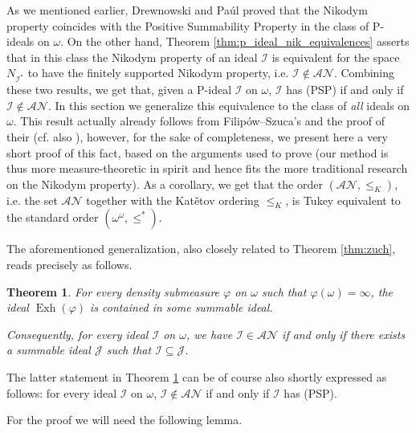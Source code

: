 \documentclass[a4paper,11pt,fleqn]{amsart}
\newtheorem{theorem}{Theorem}[section]
\theoremstyle{definition}
\theoremstyle{remark}
\numberwithin{equation}{section}
\newcommand{\aA}{\mathcal{A}}
\newcommand{\iI}{\mathcal{I}}
\newcommand{\jJ}{\mathcal{J}}
\newcommand{\nN}{\mathcal{N}}
\DeclareMathOperator{\exh}{Exh}
\newcommand{\sub}{\subseteq}
\begin{document}
As we mentioned earlier, Drewnowski and Pa\'ul \cite[Theorem 3.5]{DP00} proved that the Nikodym property coincides with the Positive Summability Property in the class of P-ideals on $\omega$. On the other hand, Theorem \ref{thm:p_ideal_nik_equivalences} asserts that in this class the Nikodym property of an ideal $\iI$ is equivalent for the space $N_{\iI^*}$ to have the finitely supported Nikodym property, i.e. $\iI\not\in\mathcal{AN}$. Combining these two results, we get that, given a P-ideal $\iI$ on $\omega$, $\iI$ has (PSP) if and only if $\iI\not\in\mathcal{AN}$. In this section we generalize this equivalence to the class of \textit{all} ideals on $\omega$. This result actually already follows from Filip\'ow--Szuca's \cite[Theorem 3.3]{FS10} and the proof of their \cite[Proposition 3.7]{FS10} (cf. also \cite[Theorem 11.2]{FT25}), however, for the sake of completeness, we present here a very short proof of this fact, based on the arguments used to prove \cite[Proposition 2.1 and Theorem 3.5]{DP00} (our method is thus more measure-theoretic in spirit and hence fits the more traditional research on the Nikodym property). As a corollary, we get that the order $(\aA\nN,\le_K)$, i.e. the set $\aA\nN$ together with the Kat\v{e}tov ordering $\le_K$, is Tukey equivalent to the standard order $(\omega^\omega,\le^*)$.

The aforementioned generalization, also closely related to Theorem \ref{thm:zuch}, reads precisely as follows.

\begin{theorem}\label{thm:an_summable}
For every density submeasure $\varphi$ on $\omega$ such that $\varphi(\omega)=\infty$, the ideal $\exh(\varphi)$ is contained in some summable ideal.

Consequently, for every ideal $\iI$ on $\omega$, we have $\iI\in\aA\nN$ if and only if there exists a summable ideal $\jJ$ such that $\iI\sub\jJ$.
\end{theorem}

The latter statement in Theorem \ref{thm:an_summable} can be of course also shortly expressed as follows: for every ideal $\iI$ on $\omega$, $\iI\not\in\aA\nN$ if and only if $\iI$ has (PSP).

For the proof we will need the following lemma. %
\end{document}
